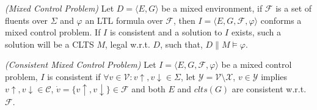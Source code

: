 \begin{definition}
	\label{def:mixed_control_problem} \emph{(Mixed Control Problem)} 
	Let $D= \langle E, G \rangle$ be a mixed environment, if $\mathcal{F}$ is a set of fluents over $\Sigma$ and $\varphi$ an LTL formula over $\mathcal{F}$, then $I = \langle E, G, \mathcal{F}, \varphi \rangle$ conforms a mixed control problem. If $I$ is consistent and a solution to $I$ exists, such a solution will be a CLTS $M$, legal w.r.t. $D$, such that, $D \parallel M \models \varphi$.
\end{definition}

\begin{definition}
	\label{def:consistent_mixed_control_problem} \emph{(Consistent Mixed Control Problem)} 
	Let $I = \langle E, G, \mathcal{F}, \varphi \rangle$ be a mixed control problem, $I$ is consistent if $\forall v \in \mathcal{V}: v\uparrow, v\downarrow \in \Sigma$, let
	$\mathcal{Y} = \mathcal{V}\setminus \mathcal{X}$, $v \in \mathcal{Y}$ implies $v\uparrow, v\downarrow \in \mathcal{C}$, $\dot{v} = \lbrace v\uparrow, v\downarrow \rbrace \in \mathcal{F}$ and both $E$ and $clts(G)$ are consistent w.r.t. $\mathcal{F}$.
\end{definition}